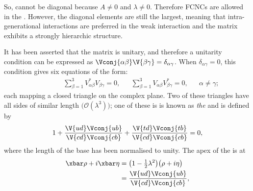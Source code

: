 So, \VCKM cannot be diagonal because $A\neq0$ and $\lambda\neq0$.
Therefore \glspl{FCNC}
are allowed in the \sm.
However, the diagonal elements are still the largest, meaning that
intra-generational interactions are preferred in the weak interaction and
the \ckm matrix exhibits a strongly hierarchic structure.


It has been asserted that the \ckm matrix is unitary, and therefore a
unitarity condition can be expressed as
$\Vconj{\alpha\beta}\V{\beta\gamma}=\delta_{\alpha\gamma}$.
When $\delta_{\alpha\gamma}=0$, this condition gives six equations of the form:
\begin{align}
  \phantom{\beta\neq\gamma}
  &&\sum_{\beta=1}^3V_{\alpha\beta}^*V_{\beta\gamma}^{\phantom{*}} = 0,
  &&\sum_{\beta=1}^3V_{\alpha\beta}^{\phantom{*}}V_{\beta\gamma}^*=0,
  &&\alpha\neq\gamma;
  \label{eq:th:offdiag}
\end{align}
each mapping a closed triangle on the complex plane.
Two of these triangles have all sides of similar length
$\big(\mathcal{O}(\lambda^3)\big)$;
one of these is
is known as \emph{the} \ut and is defined by
\begin{equation}
  1 + \frac{\V{ud}\Vconj{ub}}{\V{cd}\Vconj{cb}} + \frac{\V{td}\Vconj{tb}}{\V{cd}\Vconj{cb}} = 0,
  \label{eq:th:ut}
\end{equation}
where the length of the base has been normalised to unity.
The apex of the \ut is at
\begin{align}
  \xbar\rho+i\xbar\eta &= \big(1-\tfrac12\lambda^2\big)\big(\rho+i\eta\big)
  \nonumber\\
  &=\frac{\V{ud}\Vconj{ub}}{\V{cd}\Vconj{cb}},
\end{align}
